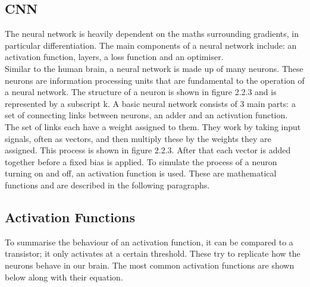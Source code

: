 \documentclass{article}
\begin{document}
\subsection{CNN}
The neural network is heavily dependent on the maths surrounding gradients, in particular differentiation. The main components of a neural network include: an activation function, layers, a loss function and an optimiser.
\\
Similar to the human brain, a neural network is made up of many neurons. These neurons are information processing units that are fundamental to the operation of a neural network. The structure of a neuron is shown in figure 2.2.3 and is represented by a subscript k.  A basic neural network consists of 3 main parts: a set of connecting links between neurons, an adder and an activation function.
\\
The set of links each have a weight assigned to them. They work by taking input signals, often as vectors, and then multiply these by the weights they are assigned. This process is shown in figure 2.2.3. After that each vector is added together before a fixed bias is applied. To simulate the process of a neuron turning on and off, an activation function is used. These are mathematical functions and are described in the following paragraphs.

\subsection{Activation Functions}
To summarise the behaviour of an activation function, it can be compared to a transistor; it only activates at a certain threshold.  These try to replicate how the neurons behave in our brain.
The most common activation functions are shown below along with their equation.
\end{document}
